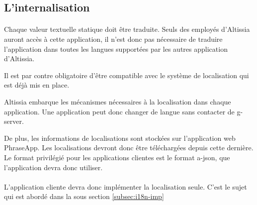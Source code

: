 \subsection{L'internalisation}
\label{subsec:i18n}

\paragraph{}
Chaque valeur textuelle statique\fnmark{} doit être traduite. Seuls des employés d'Altissia auront accès à cette application, il n'est donc pas nécessaire de traduire l'application dans toutes les langues supportées par les autres application d'Altissia\fnmark{}.

Il est par contre obligatoire d'être compatible avec le système de localisation qui est déjà mis en place.

Altissia embarque les mécanismes nécessaires à la localisation dans chaque application. Une application peut donc changer de langue sans contacter de \gls{g-server}.

De plus, les informations de localisations sont stockées sur l'application web PhraseApp.
Les localisations devront donc être téléchargées depuis cette dernière.
Le format privilégié pour les applications clientes est le format \gls{a-json}, que l'application devra donc utiliser.

\paragraph{}
L'application cliente devra donc implémenter la localisation seule. C'est le sujet qui est abordé dans la sous section \ref{subsec:i18n-imp}
